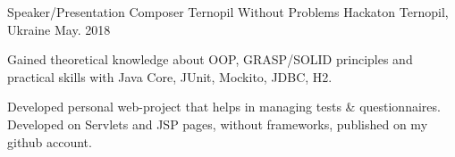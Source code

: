 
\begin{cventries}

  \cventry
    {Speaker/Presentation Composer} %
    {Ternopil Without Problems Hackaton} %
    {Ternopil, Ukraine} %
    {May. 2018} %
    {
      \begin{cvitems} %
        \item {Gained theoretical knowledge about OOP, GRASP/SOLID principles and practical skills with Java Core, JUnit, Mockito, JDBC, H2.}
        \item {Developed personal web-project that helps in managing tests \& questionnaires. Developed on Servlets and JSP pages, without frameworks, published on my github account.}
      \end{cvitems}
    }
\end{cventries}
